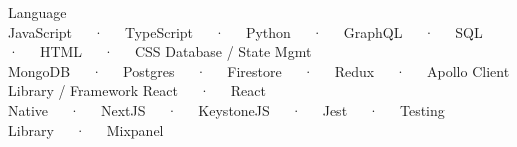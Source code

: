 

\begin{cvtechnicals}
  \cvtechnical %
  {Language} %
  {JavaScript~~~·~~~TypeScript~~~·~~~Python~~~·~~~GraphQL~~~·~~~SQL~~~·~~~HTML~~~·~~~CSS} %
  {Database / State Mgmt} %
  {MongoDB~~~·~~~Postgres~~~·~~~Firestore~~~·~~~Redux~~~·~~~Apollo Client} %
  {Library / Framework} %
  {React~~~·~~~React Native~~~·~~~NextJS~~~·~~~KeystoneJS~~~·~~~Jest~~~·~~~Testing Library~~~·~~~Mixpanel} %
\end{cvtechnicals}